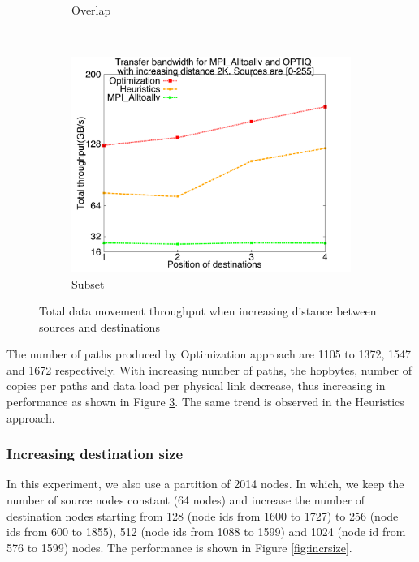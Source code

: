 \begin{figure}[!htbp]
\begin{subfigure}[b]{0.32\textwidth}
                \caption{Overlap}
                \label{fig:incrdist_overlap}
        \end{subfigure}
        ~ %
        \begin{subfigure}[b]{0.32\textwidth}
                \includegraphics[width=\textwidth]{figures/incrdist_subset}
                \caption{Subset}
                \label{fig:incrdist_subset}
        \end{subfigure}
        \caption{Total data movement throughput when increasing distance between sources and destinations}
        \label{fig:incrdist}
\end{figure}

The number of paths produced by Optimization approach are 1105 to 1372, 1547 and 1672 respectively. With increasing number of paths, the hopbytes, number of copies per paths and data load per physical link decrease, thus increasing in performance as shown in Figure \ref{fig:incrdist}. The same trend is observed in the Heuristics approach.

\subsubsection{Increasing destination size}

In this experiment, we also use a partition of 2014 nodes. In which, we keep the number of source nodes constant (64 nodes) and increase the number of destination nodes starting from 128 (node ids from 1600 to 1727) to 256 (node ids from 600 to 1855), 512 (node ids from 1088 to 1599) and 1024 (node id from 576 to 1599) nodes. The performance is shown in Figure \ref{fig:incrsize}.

